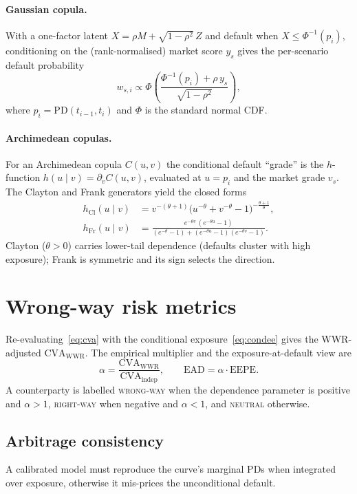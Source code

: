 \documentclass[12pt]{article}
\newcommand{\PD}{\mathrm{PD}}
\newcommand{\EEPE}{\mathrm{EEPE}}
\newcommand{\CVA}{\mathrm{CVA}}
\newcommand{\EAD}{\mathrm{EAD}}
\begin{document}
\paragraph{Gaussian copula.} With a one-factor latent
$X=\rho M+\sqrt{1-\rho^2}\,Z$ and default when $X\le\Phi^{-1}(p_i)$, conditioning
on the (rank-normalised) market score $y_s$ gives the per-scenario default
probability
\begin{equation}\label{eq:gauss}
w_{s,i}\propto
\Phi\!\left(\frac{\Phi^{-1}(p_i)+\rho\,y_s}{\sqrt{1-\rho^2}}\right),
\end{equation}
where $p_i=\PD(t_{i-1},t_i)$ and $\Phi$ is the standard normal CDF.

\paragraph{Archimedean copulas.} For an Archimedean copula $C(u,v)$ the
conditional default ``grade'' is the $h$-function $h(u\mid v)=\partial_v C(u,v)$,
evaluated at $u=p_i$ and the market grade $v_s$. The Clayton and Frank
generators yield the closed forms
\begin{align}
h_{\text{Cl}}(u\mid v)&=v^{-(\theta+1)}\big(u^{-\theta}+v^{-\theta}-1\big)^{-\frac{\theta+1}{\theta}},
\label{eq:clayton}\\
h_{\text{Fr}}(u\mid v)&=\frac{e^{-\theta v}\,(e^{-\theta u}-1)}
{(e^{-\theta}-1)+(e^{-\theta u}-1)(e^{-\theta v}-1)}.
\label{eq:frank}
\end{align}
Clayton ($\theta>0$) carries lower-tail dependence (defaults cluster with high
exposure); Frank is symmetric and its sign selects the direction.

\section{Wrong-way risk metrics}\label{sec:metrics}
Re-evaluating~\eqref{eq:cva} with the conditional exposure~\eqref{eq:condee}
gives the WWR-adjusted $\CVA_{\text{WWR}}$. The empirical multiplier and the
exposure-at-default view are
\begin{equation}
\alpha=\frac{\CVA_{\text{WWR}}}{\CVA_{\text{indep}}},\qquad
\EAD=\alpha\cdot\EEPE .
\end{equation}
A counterparty is labelled \textsc{wrong-way} when the dependence parameter is
positive and $\alpha>1$, \textsc{right-way} when negative and $\alpha<1$, and
\textsc{neutral} otherwise.

\subsection{Arbitrage consistency}
A calibrated model must reproduce the curve's marginal PDs when integrated over
exposure, otherwise it mis-prices the unconditional default.
\end{document}
